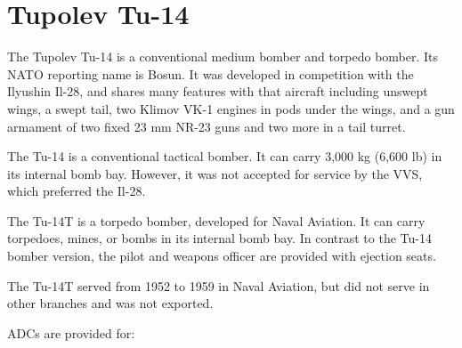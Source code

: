 \section{Tupolev Tu-14}

The Tupolev Tu-14 is a conventional medium bomber and torpedo bomber. Its NATO reporting name is Bosun. It was developed in competition with the Ilyushin Il-28, and shares many features with that aircraft including unswept wings, a swept tail, two Klimov VK-1 engines in pods under the wings, and a gun armament of two fixed 23 mm NR-23 guns and two more in a tail turret.

The Tu-14 is a conventional tactical bomber. It can carry 3,000 kg (6,600 lb) in its internal bomb bay. However, it was not accepted for service by the VVS, which preferred the Il-28.

The Tu-14T is a torpedo bomber, developed for Naval Aviation. It can carry torpedoes, mines, or bombs in its internal bomb bay. In contrast to the Tu-14 bomber version, the pilot and weapons officer are provided with ejection seats.

The Tu-14T served from 1952 to 1959 in Naval Aviation, but did not serve in other branches and was not exported.

ADCs are provided for:
\begin{adclist}
\end{adclist}